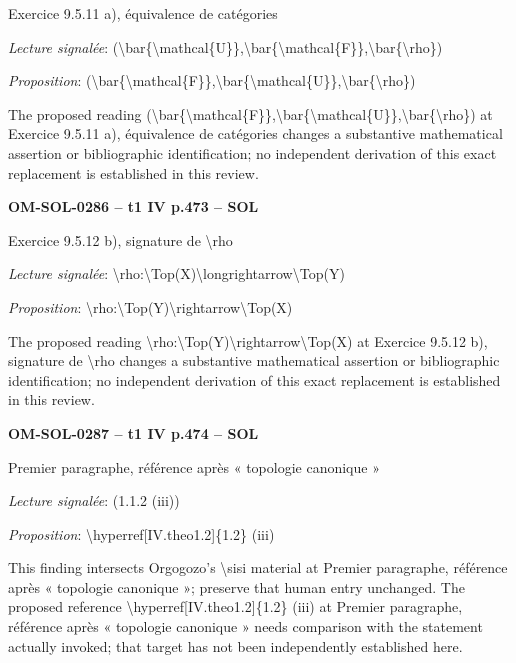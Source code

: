 Exercice 9.5.11 a), équivalence de catégories\par
\emph{Lecture signalée}: (\textbackslash{}bar\{\textbackslash{}mathcal\{U\}\},\textbackslash{}bar\{\textbackslash{}mathcal\{F\}\},\textbackslash{}bar\{\textbackslash{}rho\})\par
\emph{Proposition}: (\textbackslash{}bar\{\textbackslash{}mathcal\{F\}\},\textbackslash{}bar\{\textbackslash{}mathcal\{U\}\},\textbackslash{}bar\{\textbackslash{}rho\})\par
The proposed reading (\textbackslash{}bar\{\textbackslash{}mathcal\{F\}\},\textbackslash{}bar\{\textbackslash{}mathcal\{U\}\},\textbackslash{}bar\{\textbackslash{}rho\}) at Exercice 9.5.11 a), équivalence de catégories changes a substantive mathematical assertion or bibliographic identification; no independent derivation of this exact replacement is established in this review.\par
\par\noindent\textbf{OM-SOL-0286 -- t1 IV p.473 -- SOL}\par
Exercice 9.5.12 b), signature de \textbackslash{}rho\par
\emph{Lecture signalée}: \textbackslash{}rho:\textbackslash{}Top(X)\textbackslash{}longrightarrow\textbackslash{}Top(Y)\par
\emph{Proposition}: \textbackslash{}rho:\textbackslash{}Top(Y)\textbackslash{}rightarrow\textbackslash{}Top(X)\par
The proposed reading \textbackslash{}rho:\textbackslash{}Top(Y)\textbackslash{}rightarrow\textbackslash{}Top(X) at Exercice 9.5.12 b), signature de \textbackslash{}rho changes a substantive mathematical assertion or bibliographic identification; no independent derivation of this exact replacement is established in this review.\par
\par\noindent\textbf{OM-SOL-0287 -- t1 IV p.474 -- SOL}\par
Premier paragraphe, référence après « topologie canonique »\par
\emph{Lecture signalée}: (1.1.2 (iii))\par
\emph{Proposition}: \textbackslash{}hyperref[IV.theo1.2]\{1.2\} (iii)\par
This finding intersects Orgogozo's \textbackslash{}sisi material at Premier paragraphe, référence après « topologie canonique »; preserve that human entry unchanged. The proposed reference \textbackslash{}hyperref[IV.theo1.2]\{1.2\} (iii) at Premier paragraphe, référence après « topologie canonique » needs comparison with the statement actually invoked; that target has not been independently established here.\par
